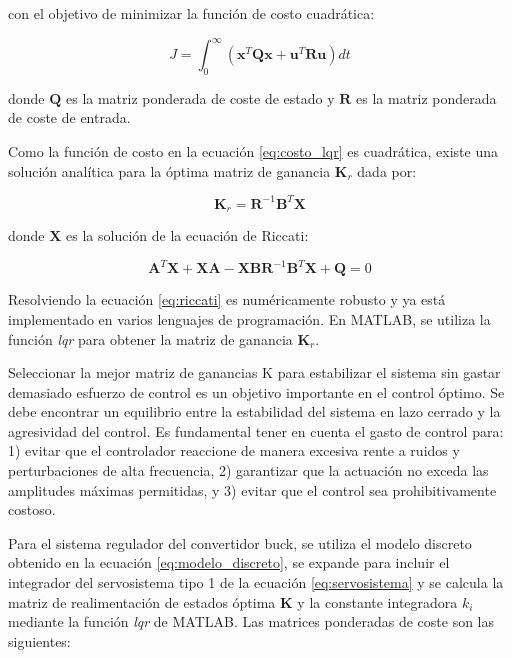 con el objetivo de minimizar la función de costo cuadrática:

\vspace{-0.5cm}
\begin{equation}
    J = \int_{0}^{\infty} (\textbf{x}^T \textbf{Q} \textbf{x} + \textbf{u}^T \textbf{R} \textbf{u}) dt
    \label{eq:costo_lqr}
\end{equation}

donde $\textbf{Q}$ es la matriz ponderada de coste de estado y $\textbf{R}$ es la matriz ponderada de coste de entrada.

Como la función de costo en la ecuación \ref{eq:costo_lqr} es cuadrática, existe una solución analítica para 
la óptima matriz de ganancia $\textbf{K}_r$ dada por:

\vspace{-0.5cm}
\begin{equation}
    \textbf{K}_r = \textbf{R}^{-1} \textbf{B}^T \textbf{X}
\end{equation}

donde $\textbf{X}$ es la solución de la ecuación de Riccati:

\vspace{-0.5cm}
\begin{equation}
    \textbf{A}^T \textbf{X} + \textbf{X} \textbf{A} - \textbf{X} \textbf{B} \textbf{R}^{-1} \textbf{B}^T \textbf{X} + \textbf{Q} = 0
    \label{eq:riccati}
\end{equation}

Resolviendo la ecuación \ref{eq:riccati} es numéricamente robusto y ya está implementado en varios lenguajes de programación.
En MATLAB, se utiliza la función \textit{lqr} para obtener la matriz de ganancia $\textbf{K}_r$.\parencite{MATLAB_lqr}

Seleccionar la mejor matriz de ganancias K para estabilizar el sistema sin gastar demasiado esfuerzo de control es un objetivo importante en el control óptimo.
Se debe encontrar un equilibrio entre la estabilidad del sistema en lazo cerrado y la agresividad del control.
Es fundamental tener en cuenta el gasto de control para: 1) evitar que el controlador reaccione de manera excesiva 
rente a ruidos y perturbaciones de alta frecuencia, 2) garantizar que la actuación no exceda las amplitudes máximas
permitidas, y 3) evitar que el control sea prohibitivamente costoso. \parencite{BRUNTON}

Para el sistema regulador del convertidor buck, se utiliza el modelo discreto obtenido en la ecuación \ref{eq:modelo_discreto},
se expande para incluir el integrador del servosistema tipo 1 de la ecuación \ref{eq:servosistema} y se calcula la matriz de 
realimentación de estados óptima $\mathbf{K}$ y la constante integradora $k_i$ mediante la función \textit{lqr} de MATLAB. Las matrices ponderadas
de coste son las siguientes:

